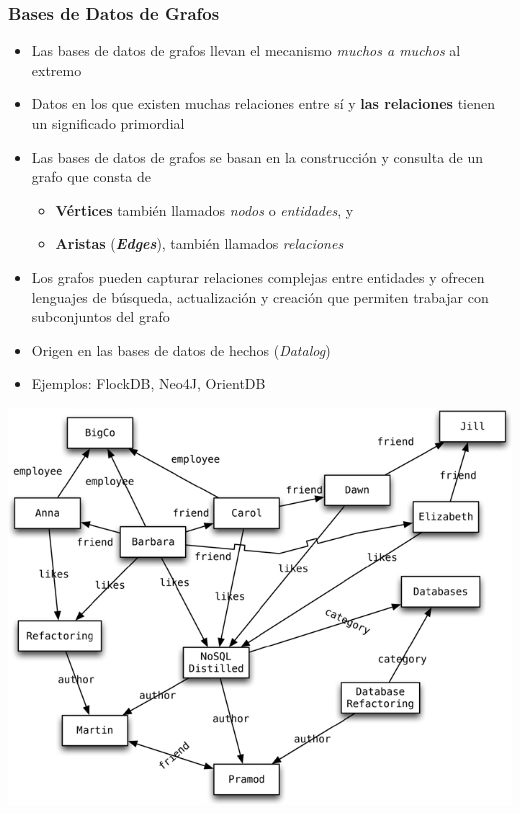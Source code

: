 \documentclass[14pt]{beamer}
\begin{document}
\begin{frame}[allowframebreaks]
  \frametitle{Bases de Datos de Grafos}
\vspace*{-1ex}
  \begin{itemize}
  \item Las bases de datos de grafos llevan el mecanismo {\em muchos a
      muchos} al extremo
  \item Datos en los que existen muchas relaciones entre sí y {\bf las
      relaciones} tienen un significado primordial
\item Las bases de datos de grafos se basan en la construcción y consulta
  de un grafo que consta de
  \begin{itemize}
  \item {\bf Vértices} también llamados {\em nodos} o {\em entidades}, y
  \item {\bf Aristas} ({\bfseries\itshape Edges}), también llamados {\em
      relaciones}
  \end{itemize}
\item Los grafos pueden capturar relaciones complejas entre
  entidades y ofrecen lenguajes de búsqueda, actualización y creación que
  permiten trabajar con subconjuntos del grafo
\item Origen en las bases de datos de hechos ({\em Datalog\/})
\item Ejemplos: FlockDB, Neo4J, OrientDB
\end{itemize}
\end{frame}

\begin{frame}[plain]
\includegraphics[width=\textwidth]{img/graph}
\end{frame}
\end{document}

